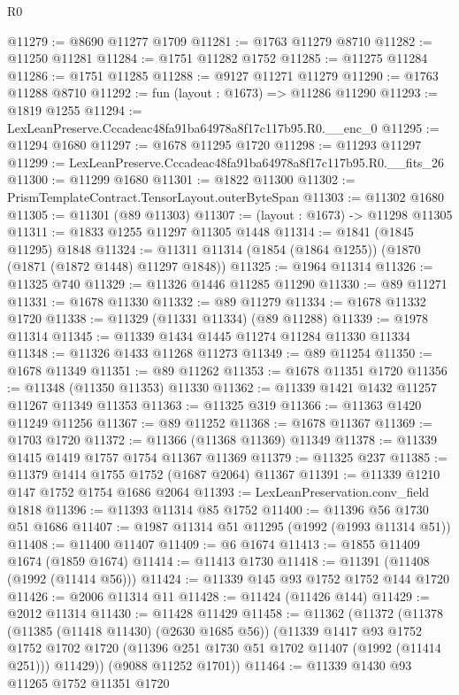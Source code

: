 \begin{lexlean}{R0}
\begin{coremodule}
@11279 := @8690 @11277 @1709
@11281 := @1763 @11279 @8710
@11282 := @11250 @11281
@11284 := @1751 @11282 @1752
@11285 := @11275 @11284
@11286 := @1751 @11285
@11288 := @9127 @11271 @11279
@11290 := @1763 @11288 @8710
@11292 := fun (layout : @1673) => @11286 @11290
@11293 := @1819 @1255
@11294 := LexLeanPreserve.Cccadeac48fa91ba64978a8f17c117b95.R0.__enc_0
@11295 := @11294 @1680
@11297 := @1678 @11295 @1720
@11298 := @11293 @11297
@11299 := LexLeanPreserve.Cccadeac48fa91ba64978a8f17c117b95.R0.__fits_26
@11300 := @11299 @1680
@11301 := @1822 @11300
@11302 := PrismTemplateContract.TensorLayout.outerByteSpan
@11303 := @11302 @1680
@11305 := @11301 (@89 @11303)
@11307 := (layout : @1673) -> @11298 @11305
@11311 := @1833 @1255 @11297 @11305 @1448
@11314 := @1841 (@1845 @11295) @1848
@11324 := @11311 @11314 (@1854 (@1864 @1255)) (@1870 (@1871 (@1872 @1448) @11297 @1848))
@11325 := @1964 @11314
@11326 := @11325 @740
@11329 := @11326 @1446 @11285 @11290
@11330 := @89 @11271
@11331 := @1678 @11330
@11332 := @89 @11279
@11334 := @1678 @11332 @1720
@11338 := @11329 (@11331 @11334) (@89 @11288)
@11339 := @1978 @11314
@11345 := @11339 @1434 @1445 @11274 @11284 @11330 @11334
@11348 := @11326 @1433 @11268 @11273
@11349 := @89 @11254
@11350 := @1678 @11349
@11351 := @89 @11262
@11353 := @1678 @11351 @1720
@11356 := @11348 (@11350 @11353) @11330
@11362 := @11339 @1421 @1432 @11257 @11267 @11349 @11353
@11363 := @11325 @319
@11366 := @11363 @1420 @11249 @11256
@11367 := @89 @11252
@11368 := @1678 @11367
@11369 := @1703 @1720
@11372 := @11366 (@11368 @11369) @11349
@11378 := @11339 @1415 @1419 @1757 @1754 @11367 @11369
@11379 := @11325 @237
@11385 := @11379 @1414 @1755 @1752 (@1687 @2064) @11367
@11391 := @11339 @1210 @147 @1752 @1754 @1686 @2064
@11393 := LexLeanPreservation.conv_field @1818
@11396 := @11393 @11314 @85 @1752
@11400 := @11396 @56 @1730 @51 @1686
@11407 := @1987 @11314 @51 @11295 (@1992 (@1993 @11314 @51))
@11408 := @11400 @11407
@11409 := @6 @1674
@11413 := @1855 @11409 @1674 (@1859 @1674)
@11414 := @11413 @1730
@11418 := @11391 (@11408 (@1992 (@11414 @56)))
@11424 := @11339 @145 @93 @1752 @1752 @144 @1720
@11426 := @2006 @11314 @11
@11428 := @11424 (@11426 @144)
@11429 := @2012 @11314
@11430 := @11428 @11429
@11458 := @11362
    (@11372
      (@11378
        (@11385 (@11418 @11430) (@2630 @1685 @56))
        (@11339
          @1417
          @93
          @1752
          @1752
          @1702
          @1720
          (@11396 @251 @1730 @51 @1702 @11407 (@1992 (@11414 @251)))
          @11429))
      (@9088 @11252 @1701))
@11464 := @11339 @1430 @93 @11265 @1752 @11351 @1720

\end{coremodule}
\end{lexlean}
